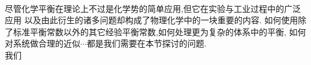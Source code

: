 \documentclass{ctexart}
\begin{document}
\pagestyle{plain}
\noindent{}\vspace{15pt}\\
\indent 尽管化学平衡在理论上不过是化学势的简单应用,但它在实验与工业过程中的广泛应用%
以及由此衍生的诸多问题却构成了物理化学中的一块重要的内容.%
如何使用除了标准平衡常数以外的其它经验平衡常数,如何处理更为复杂的体系中的平衡,%
如何对系统做合理的近似$\cdots$都是我们需要在本节探讨的问题.\vspace{12pt}\\
\indent 我们
\end{document}
